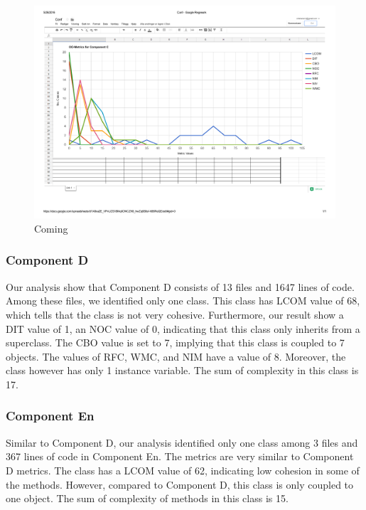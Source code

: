 \begin{landscape}
\setlength\LTleft{-.5in}
	\begin{figure}
	\centering
	\includegraphics[width=\textwidth]{images/conf.pdf}
	\caption{Coming}
	\label{fig:confgraph}
	\end{figure}
\end{landscape}


\subsubsection{Component D}
Our analysis show that Component D consists of 13 files and 1647 lines of code. Among these files, we identified only one class. This class has LCOM value of 68, which tells that the class is not very cohesive. Furthermore, our result show a DIT value of 1, an NOC value of 0, indicating that this class only inherits from a superclass. The CBO value is set to 7, implying that this class is coupled to 7 objects. The values of RFC, WMC, and NIM have a value of 8. Moreover, the class however has only 1 instance variable. The sum of complexity in this class is 17.



\subsubsection{Component En}
Similar to Component D, our analysis identified only one class among 3 files and 367 lines of code in Component En. The metrics are very similar to Component D metrics. The class has a LCOM value of 62, indicating low cohesion in some of the methods. However, compared to Component D, this class is only coupled to one object. The sum of complexity of methods in this class is 15.


